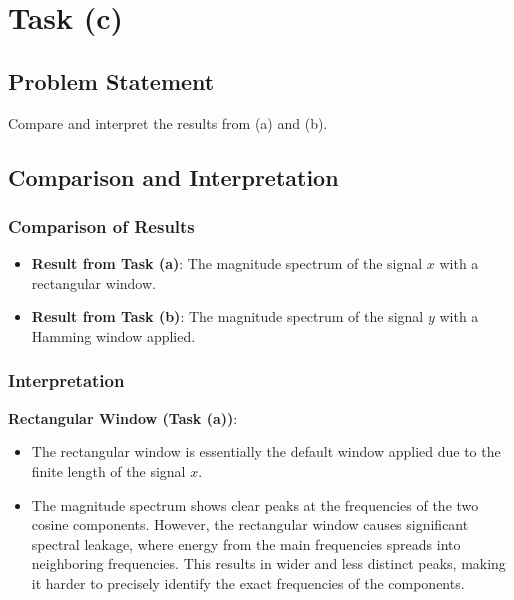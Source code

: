\item[(c)]
\section*{Task (c)}

\subsection*{Problem Statement}
Compare and interpret the results from (a) and (b).

\subsection*{Comparison and Interpretation}

\subsubsection*{Comparison of Results}

\begin{itemize}
    \item \textbf{Result from Task (a)}: The magnitude spectrum of the signal \( x \) with a rectangular window.
    \item \textbf{Result from Task (b)}: The magnitude spectrum of the signal \( y \) with a Hamming window applied.
\end{itemize}

\subsubsection*{Interpretation}

\textbf{Rectangular Window (Task (a))}:
\begin{itemize}
    \item The rectangular window is essentially the default window applied due to the finite length of the signal \( x \).
    \item The magnitude spectrum shows clear peaks at the frequencies of the two cosine components. However, the rectangular window causes significant spectral leakage, where energy from the main frequencies spreads into neighboring frequencies. This results in wider and less distinct peaks, making it harder to precisely identify the exact frequencies of the components.
\end{itemize}


